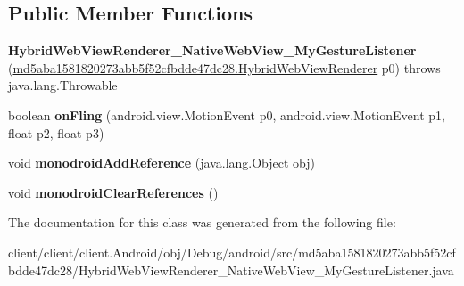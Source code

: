 \subsection*{Public Member Functions}
\begin{DoxyCompactItemize}
\item 
\hypertarget{classmd5aba1581820273abb5f52cfbdde47dc28_1_1HybridWebViewRenderer__NativeWebView__MyGestureListener_a186eb3012c6ebc64bf5c8f0247b5c013}{}{\bfseries Hybrid\+Web\+View\+Renderer\+\_\+\+Native\+Web\+View\+\_\+\+My\+Gesture\+Listener} (\hyperlink{classmd5aba1581820273abb5f52cfbdde47dc28_1_1HybridWebViewRenderer}{md5aba1581820273abb5f52cfbdde47dc28.\+Hybrid\+Web\+View\+Renderer} p0)  throws java.\+lang.\+Throwable 	\label{classmd5aba1581820273abb5f52cfbdde47dc28_1_1HybridWebViewRenderer__NativeWebView__MyGestureListener_a186eb3012c6ebc64bf5c8f0247b5c013}

\item 
\hypertarget{classmd5aba1581820273abb5f52cfbdde47dc28_1_1HybridWebViewRenderer__NativeWebView__MyGestureListener_a44a9e4aefd20973669325fb24049ee3c}{}boolean {\bfseries on\+Fling} (android.\+view.\+Motion\+Event p0, android.\+view.\+Motion\+Event p1, float p2, float p3)\label{classmd5aba1581820273abb5f52cfbdde47dc28_1_1HybridWebViewRenderer__NativeWebView__MyGestureListener_a44a9e4aefd20973669325fb24049ee3c}

\item 
\hypertarget{classmd5aba1581820273abb5f52cfbdde47dc28_1_1HybridWebViewRenderer__NativeWebView__MyGestureListener_a007d2eae500ebc95ec04765dd985c18b}{}void {\bfseries monodroid\+Add\+Reference} (java.\+lang.\+Object obj)\label{classmd5aba1581820273abb5f52cfbdde47dc28_1_1HybridWebViewRenderer__NativeWebView__MyGestureListener_a007d2eae500ebc95ec04765dd985c18b}

\item 
\hypertarget{classmd5aba1581820273abb5f52cfbdde47dc28_1_1HybridWebViewRenderer__NativeWebView__MyGestureListener_a37b40d84b047ae77d6c7c077d61cff2f}{}void {\bfseries monodroid\+Clear\+References} ()\label{classmd5aba1581820273abb5f52cfbdde47dc28_1_1HybridWebViewRenderer__NativeWebView__MyGestureListener_a37b40d84b047ae77d6c7c077d61cff2f}

\end{DoxyCompactItemize}


The documentation for this class was generated from the following file\+:\begin{DoxyCompactItemize}
\item 
client/client/client.\+Android/obj/\+Debug/android/src/md5aba1581820273abb5f52cfbdde47dc28/Hybrid\+Web\+View\+Renderer\+\_\+\+Native\+Web\+View\+\_\+\+My\+Gesture\+Listener.\+java\end{DoxyCompactItemize}

